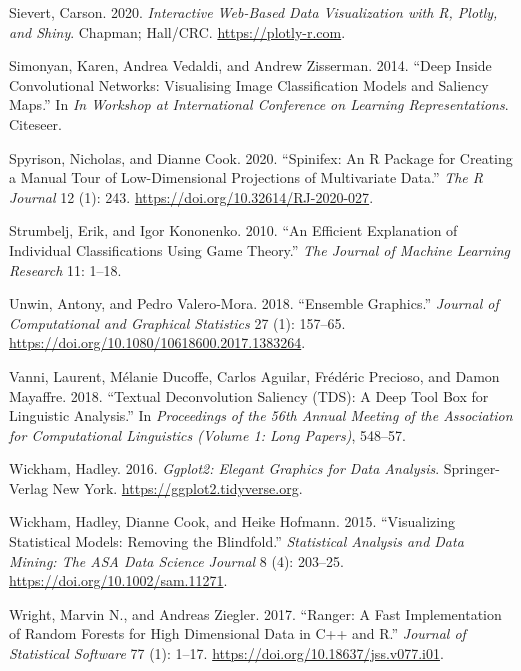 \documentclass[11pt,twoside]{article}
\newlength{\cslhangindent}
\newlength{\cslentryspacingunit} %
\newenvironment{CSLReferences}[2] %
 {%
  \setlength{\parindent}{0pt}
  \ifodd #1
  \let\oldpar\par
  \def\par{\hangindent=\cslhangindent\oldpar}
  \fi
  \setlength{\parskip}{#2\cslentryspacingunit}
 }%
 {}
\begin{document}
\begin{CSLReferences}{1}{0}
\leavevmode\hypertarget{ref-sievert_interactive_2020}{}%
Sievert, Carson. 2020. \emph{Interactive {Web}-{Based} {Data} {Visualization} with {R}, Plotly, and Shiny}. Chapman; Hall/CRC. \url{https://plotly-r.com}.

\leavevmode\hypertarget{ref-simonyan_deep_2014}{}%
Simonyan, Karen, Andrea Vedaldi, and Andrew Zisserman. 2014. {``Deep Inside Convolutional Networks: {Visualising} Image Classification Models and Saliency Maps.''} In \emph{In {Workshop} at {International} {Conference} on {Learning} {Representations}}. Citeseer.

\leavevmode\hypertarget{ref-spyrison_spinifex_2020}{}%
Spyrison, Nicholas, and Dianne Cook. 2020. {``Spinifex: An {R} {Package} for {Creating} a {Manual} {Tour} of {Low}-Dimensional {Projections} of {Multivariate} {Data}.''} \emph{The R Journal} 12 (1): 243. \url{https://doi.org/10.32614/RJ-2020-027}.

\leavevmode\hypertarget{ref-strumbelj_efficient_2010}{}%
Strumbelj, Erik, and Igor Kononenko. 2010. {``An Efficient Explanation of Individual Classifications Using Game Theory.''} \emph{The Journal of Machine Learning Research} 11: 1--18.

\leavevmode\hypertarget{ref-unwin_ensemble_2018}{}%
Unwin, Antony, and Pedro Valero-Mora. 2018. {``Ensemble {Graphics}.''} \emph{Journal of Computational and Graphical Statistics} 27 (1): 157--65. \url{https://doi.org/10.1080/10618600.2017.1383264}.

\leavevmode\hypertarget{ref-vanni_textual_2018}{}%
Vanni, Laurent, Mélanie Ducoffe, Carlos Aguilar, Frédéric Precioso, and Damon Mayaffre. 2018. {``Textual {Deconvolution} {Saliency} ({TDS}): A Deep Tool Box for Linguistic Analysis.''} In \emph{Proceedings of the 56th {Annual} {Meeting} of the {Association} for {Computational} {Linguistics} ({Volume} 1: {Long} {Papers})}, 548--57.

\leavevmode\hypertarget{ref-wickham_ggplot2_2016}{}%
Wickham, Hadley. 2016. \emph{Ggplot2: {Elegant} {Graphics} for {Data} {Analysis}}. Springer-Verlag New York. \url{https://ggplot2.tidyverse.org}.

\leavevmode\hypertarget{ref-wickham_visualizing_2015}{}%
Wickham, Hadley, Dianne Cook, and Heike Hofmann. 2015. {``Visualizing Statistical Models: {Removing} the Blindfold.''} \emph{Statistical Analysis and Data Mining: The ASA Data Science Journal} 8 (4): 203--25. \url{https://doi.org/10.1002/sam.11271}.

\leavevmode\hypertarget{ref-wright_ranger_2017}{}%
Wright, Marvin N., and Andreas Ziegler. 2017. {``Ranger: {A} {Fast} {Implementation} of {Random} {Forests} for {High} {Dimensional} {Data} in {C}++ and {R}.''} \emph{Journal of Statistical Software} 77 (1): 1--17. \url{https://doi.org/10.18637/jss.v077.i01}.

\end{CSLReferences}




\vskip 0.2in

\end{document}
